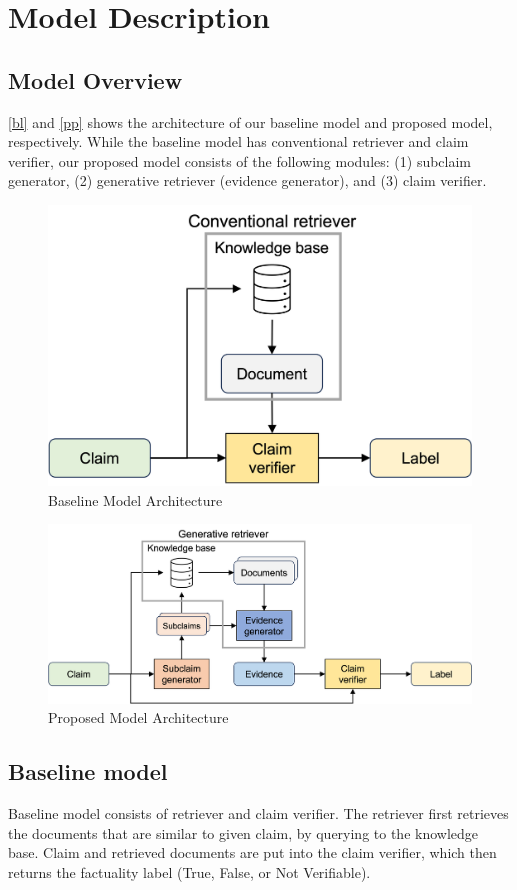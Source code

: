 \documentclass{article}
\begin{document}
\section{Model Description}

\subsection{Model Overview}
\autoref{bl} and \autoref{pp} shows the architecture of our baseline model and proposed model, respectively. While the baseline model has conventional retriever and claim verifier, our proposed model consists of the following modules: (1) subclaim generator, (2) generative retriever (evidence generator), and (3) claim verifier. 

\begin{figure}[h]
  \centering
  \includegraphics[width=0.45\linewidth]{Figure/Fig1.png}
  \caption{\label{bl}Baseline Model Architecture}
\end{figure}\begin{figure}[h]
  \centering
  \includegraphics[width=0.8\linewidth]{Figure/Fig2.png}
  \caption{\label{pp}Proposed Model Architecture}
\end{figure}

\subsection{Baseline model}
Baseline model consists of retriever and claim verifier. The retriever first retrieves the documents that are similar to given claim, by querying to the knowledge base. Claim and retrieved documents are put into the claim verifier, which then returns the factuality label (True, False, or Not Verifiable).
\end{document}
